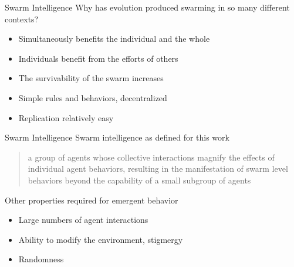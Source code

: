 
\begin{slide}{Swarm Intelligence}
  Why has evolution produced swarming in so many different contexts?
  \begin{itemize}
    \itemsep=3ex
    \bigskip
  \item Simultaneously benefits the individual and the whole
  \item Individuals benefit from the efforts of others
  \item The survivability of the swarm increases
  \item Simple rules and behaviors, decentralized
  \item Replication relatively easy
  \end{itemize}
\end{slide}


\begin{slide}{Swarm Intelligence}
  Swarm intelligence as defined for this work
  
  \begin{quote}
    a group of agents whose collective interactions magnify the
    effects of individual agent behaviors, resulting in the
    manifestation of swarm level behaviors beyond the capability of
    a small subgroup of agents
  \end{quote}
  
  Other properties required for emergent behavior
  \begin{itemize}
  \item Large numbers of agent interactions
  \item Ability to modify the environment, stigmergy
  \item Randomness
  \end{itemize}
\end{slide}

